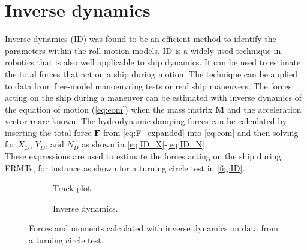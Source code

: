 \section{Inverse dynamics} \label{sec:ID}
Inverse dynamics (ID) was found to be an efficient method to identify the parameters within the roll motion models. ID is a widely used technique in robotics \cite{faberInverseDynamicsMechanical2018, haningerNonparametricInverseDynamic2019, mastalliInverseDynamicsMPCNullspace2023, sunHighorderInverseDynamics2023, kurtzInverseDynamicsTrajectory2023} that is also well applicable to ship dynamics. It can be used to estimate the total forces that act on a ship during motion. The technique can be applied to data from free-model manoeuvring tests or real ship maneuvers. The forces acting on the ship during a maneuver can be estimated with inverse dynamics of the equation of motion (\autoref{eq:eom}) when the mass matrix $\mathbf{M}$ and the acceleration vector $\pmb{\dot{\upsilon}}$ are known. The hydrodynamic damping forces can be calculated by inserting the total force $\mathbf{F}$ from \autoref{eq:F_expanded} into \autoref{eq:eom} and then solving for $X_D$, $Y_D$, and $N_D$ as shown in \autoref{eq:ID_X}-\autoref{eq:ID_N}.
\begin{equation}
    \label{eq:ID_X}
    
\end{equation}
\begin{equation}
    \label{eq:ID_Y}
    
\end{equation}
\begin{equation}
    \label{eq:ID_N}
    
\end{equation}
These expressions are used to estimate the forces acting on the ship during FRMTs, for instance as shown for a turning circle test in \autoref{fig:ID}.
\begin{figure}[h]
     \centering
     \begin{subfigure}[b]{0.49\textwidth}
         \centering
         
        \caption{Track plot.}
        \label{fig:sim_optiwise_10_port}
     \end{subfigure}
     \hfill
     \begin{subfigure}[b]{0.49\textwidth}
         
        \caption{Inverse dynamics.}
        \label{fig:sim_optiwise_10_stbd}
     \end{subfigure}
    \caption{Forces and moments calculated with inverse dynamics on data from a turning circle test.}
    \label{fig:ID}
\end{figure}

